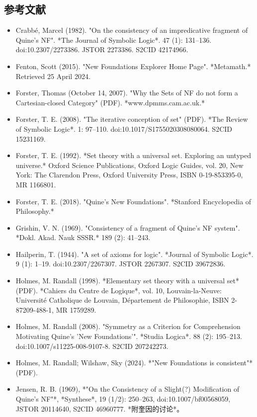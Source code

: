 \subsection{参考文献}
\begin{itemize}
\item Crabbé, Marcel (1982). "On the consistency of an impredicative fragment of Quine's NF". *The Journal of Symbolic Logic*. 47 (1): 131–136. doi:10.2307/2273386. JSTOR 2273386. S2CID 42174966.  
\item Fenton, Scott (2015). "New Foundations Explorer Home Page". *Metamath.* Retrieved 25 April 2024.  
\item Forster, Thomas (October 14, 2007). "Why the Sets of NF do not form a Cartesian-closed Category" (PDF). *www.dpmms.cam.ac.uk.*  
\item Forster, T. E. (2008). "The iterative conception of set" (PDF). *The Review of Symbolic Logic*. 1: 97–110. doi:10.1017/S1755020308080064. S2CID 15231169.  
\item Forster, T. E. (1992). *Set theory with a universal set. Exploring an untyped universe.* Oxford Science Publications, Oxford Logic Guides, vol. 20, New York: The Clarendon Press, Oxford University Press, ISBN 0-19-853395-0, MR 1166801.  
\item Forster, T. E. (2018). "Quine's New Foundations". *Stanford Encyclopedia of Philosophy.*  
\item Grishin, V. N. (1969). "Consistency of a fragment of Quine's NF system". *Dokl. Akad. Nauk SSSR.* 189 (2): 41–243.  
\item Hailperin, T. (1944). "A set of axioms for logic". *Journal of Symbolic Logic*. 9 (1): 1–19. doi:10.2307/2267307. JSTOR 2267307. S2CID 39672836.  
\item Holmes, M. Randall (1998). *Elementary set theory with a universal set* (PDF). *Cahiers du Centre de Logique*, vol. 10, Louvain-la-Neuve: Université Catholique de Louvain, Département de Philosophie, ISBN 2-87209-488-1, MR 1759289.  
\item Holmes, M. Randall (2008). "Symmetry as a Criterion for Comprehension Motivating Quine's 'New Foundations'". *Studia Logica*. 88 (2): 195–213. doi:10.1007/s11225-008-9107-8. S2CID 207242273.
\item Holmes, M. Randall; Wilshaw, Sky (2024). *"New Foundations is consistent"* (PDF).  
\item Jensen, R. B. (1969), *"On the Consistency of a Slight(?) Modification of Quine's NF"*, *Synthese*, 19 (1/2): 250–263, doi:10.1007/bf00568059, JSTOR 20114640, S2CID 46960777. *附奎因的讨论*。  

\end{itemize}
